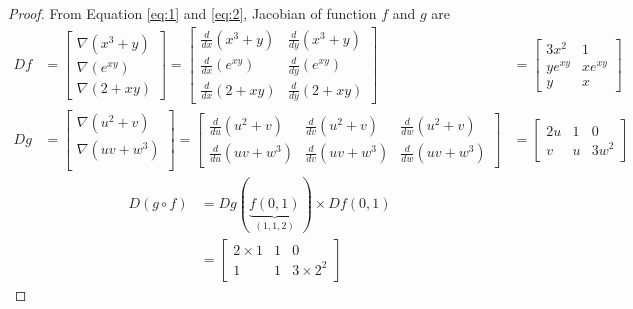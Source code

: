 \documentclass[12pt]{article}
\theoremstyle{definition}
\begin{document}
\begin{proof}
    From Equation \ref{eq:1} and \ref{eq:2}, Jacobian of function $f$ and $g$ are
    \begin{align}
        Df&=\begin{bmatrix}
                \nabla (x^{3}+y) \\
                \nabla (e^{xy})  \\
                \nabla (2+xy)
            \end{bmatrix}
           =\begin{bmatrix}
                \frac{d}{dx}(x^{3}+y) & \frac{d}{dy}(x^{3}+y) \\
                \frac{d}{dx}(e^{xy})  & \frac{d}{dy}(e^{xy})  \\
                \frac{d}{dx}(2+xy)    & \frac{d}{dy}(2+xy)
            \end{bmatrix}
          &=\begin{bmatrix}
                3x^{2}  & 1      \\
                ye^{xy} & xe^{xy} \\
                y & x
            \end{bmatrix}\\
        Dg&=\begin{bmatrix}
                \nabla (u^{2}+v) \\
                \nabla (uv+w^{3})  \\
            \end{bmatrix}
            =\begin{bmatrix}
                \frac{d}{du}(u^{2}+v)  & \frac{d}{dv}(u^{2}+v)  & \frac{d}{dw}(u^{2}+v) \\
                \frac{d}{du}(uv+w^{3}) & \frac{d}{dv}(uv+w^{3}) & \frac{d}{dw}(uv+w^{3})
            \end{bmatrix}
          &=\begin{bmatrix}
                2u & 1 & 0      \\
                v  & u & 3w^{2} 
            \end{bmatrix}
    \end{align}
    \begin{align}
        D(g \circ f) &= Dg(\underbrace{f(0,1)}_{(1,1,2)}) \times Df(0,1) \\
                     &= \begin{bmatrix}
                            2 \times 1 & 1 & 0              \\
                            1          & 1 & 3 \times 2^{2} 

\end{bmatrix}
\end{align}
\end{proof}
\end{document}
